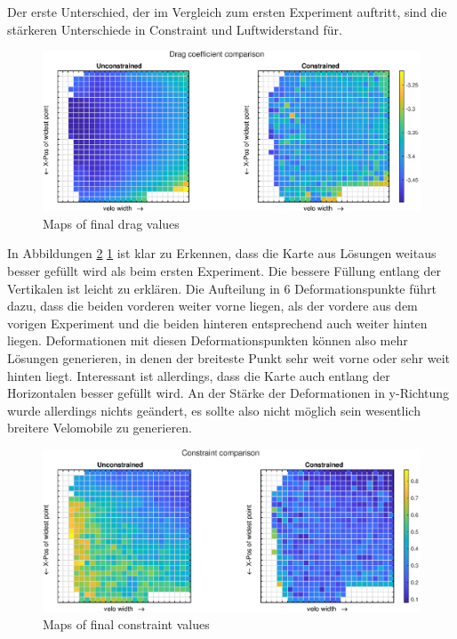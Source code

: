 Der erste Unterschied, der im Vergleich zum ersten Experiment auftritt, sind die stärkeren Unterschiede in Constraint und Luftwiderstand für.


\begin{figure}[h]
	\includegraphics[width=1\linewidth]{bilder/6pt500Samples/dragMapComparison}
	\caption{Maps of final drag values}
	\label{fig:2ndmapDrag}
\end{figure}

In Abbildungen \ref{fig:2ndmapCon} \ref{fig:2ndmapDrag} ist klar zu Erkennen, dass die Karte aus Lösungen weitaus besser gefüllt wird als beim ersten Experiment.
Die bessere Füllung entlang der Vertikalen ist leicht zu erklären.
Die Aufteilung in 6 Deformationspunkte führt dazu, dass die beiden vorderen weiter vorne liegen, als der vordere aus dem vorigen Experiment und die beiden hinteren entsprechend auch weiter hinten liegen.
Deformationen mit diesen Deformationspunkten können also mehr Lösungen generieren, in denen der breiteste Punkt sehr weit vorne oder sehr weit hinten liegt.
Interessant ist allerdings, dass die Karte auch entlang der Horizontalen  besser gefüllt wird.
An der Stärke der Deformationen in y-Richtung wurde allerdings nichts geändert, es sollte also nicht möglich sein wesentlich breitere Velomobile zu generieren.

\begin{figure}[h]
	\includegraphics[width=1\linewidth]{bilder/6pt500Samples/constraintMapComparison}
	\caption{Maps of final constraint values}
	\label{fig:2ndmapCon}
\end{figure}

